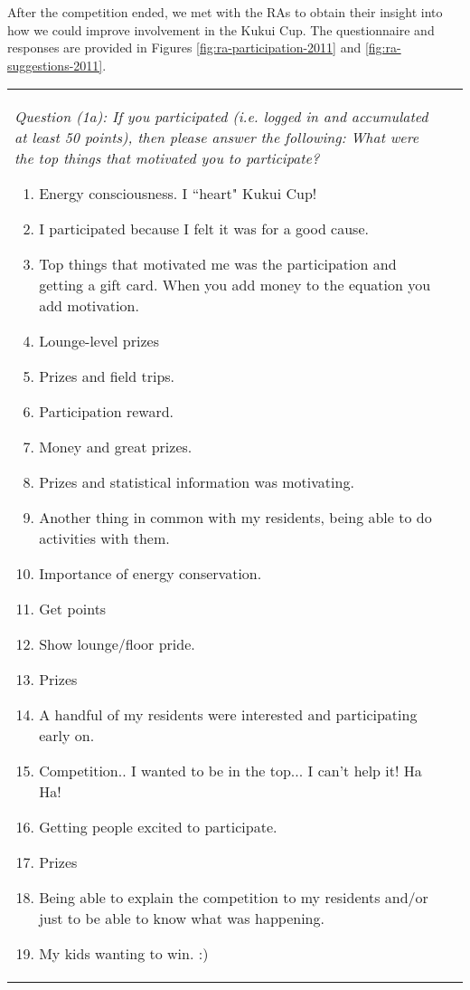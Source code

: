 \documentclass[]{IEEEconf}
\begin{document}
After the competition ended, we met with the RAs to obtain their insight into how we could
improve involvement in the Kukui Cup.   The questionnaire and responses are provided in
Figures \ref{fig:ra-participation-2011} and \ref{fig:ra-suggestions-2011}.

\begin{figure*}[t]
\begin{tabular}{|l|l|}
\hline

\small  \begin{minipage}[t]{3in}
{\em Question  (1a):  If you participated (i.e. logged in and accumulated at least 50 points), then please answer the 
following:  What were the top things that motivated you to participate?}
\begin{enumerate}
\item Energy consciousness.  I ``heart" Kukui Cup!
\item I participated because I felt it was for a good cause.
\item Top things that motivated me was the participation and getting a gift card.  When you add money to the equation you add motivation.
\item Lounge-level prizes
\item Prizes and field trips.
\item Participation reward.
\item Money and great prizes.
\item Prizes and statistical information was motivating.
\item Another thing in common with my residents, being able to do activities with them.
\item Importance of energy conservation. 
\item Get points
\item Show lounge/floor pride.
\item Prizes
\item A handful of my residents were interested and participating early on. 
\item Competition.. I wanted to be in the top... I can't help it!  Ha Ha!
\item Getting people excited to participate.  
\item Prizes
\item Being able to explain the competition to my residents and/or just to be able to know what was happening. 
\item My kids wanting to win. :)
\end{enumerate}
\end{minipage}  \normalsize


\end{tabular}
\end{figure*}
\end{document}
